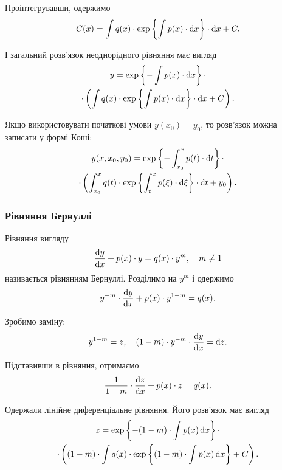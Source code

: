 Проінтегрувавши, одержимо
\begin{equation*} 
	C(x) = \int q(x) \cdot \exp \left\{\int p(x) \cdot \mathop{}\!\mathrm{d} x \right\} \cdot \mathop{}\!\mathrm{d} x + C.
\end{equation*}

І загальний розв’язок неоднорідного рівняння має вигляд
\begin{multline} 
	y = \exp \left\{ - \int p(x) \cdot \mathop{}\!\mathrm{d} x \right\} \cdot \\
	\cdot \left( \int q(x) \cdot \exp \left\{\int p(x) \cdot \mathop{}\!\mathrm{d} x \right\} \cdot \mathop{}\!\mathrm{d} x + C\right).
\end{multline}

Якщо використовувати початкові умови $y(x_0) = y_0$, то розв’язок можна записати у формі Коші:
\begin{multline} 
	y(x, x_0, y_0) = \exp \left\{ - \int_{x_0}^x p(t) \cdot \mathop{}\!\mathrm{d} t \right\} \cdot \\
	\cdot \left( \int_{x_0}^x q(t) \cdot \exp \left\{\int_t^x p(\xi) \cdot \mathop{}\!\mathrm{d} \xi \right\} \cdot \mathop{}\!\mathrm{d} t + y_0\right).
\end{multline}

\subsubsection{Рівняння Бернуллі}

Рівняння вигляду
\begin{equation*}
	\frac{\mathop{}\!\mathrm{d} y}{\mathop{}\!\mathrm{d} x} + p(x) \cdot y = q(x) \cdot y^m, \quad m \ne 1
\end{equation*}
називається рівнянням Бернуллі. Розділимо на $y^m$ і одержимо 
\begin{equation*}
	y^{-m} \cdot \frac{\mathop{}\!\mathrm{d} y}{\mathop{}\!\mathrm{d} x} + p(x) \cdot y^{1-m} = q(x).
\end{equation*}

Зробимо заміну: 
\begin{equation*}
	y^{1-m} = z, \quad (1 - m) \cdot y^{-m} \cdot \frac{\mathop{}\!\mathrm{d} y}{\mathop{}\!\mathrm{d} x} = \mathop{}\!\mathrm{d} z.
\end{equation*}

Підставивши в рівняння, отримаємо
\begin{equation*}
	\frac{1}{1-m} \cdot \frac{\mathop{}\!\mathrm{d} z}{\mathop{}\!\mathrm{d} x} + p(x) \cdot z = q(x).
\end{equation*}

Одержали лінійне диференціальне рівняння. Його розв’язок має вигляд
\begin{multline}
	z = \exp\left\{ -(1 - m) \cdot \int p(x) \mathop{}\!\mathrm{d} x \right\} \cdot \\
	\cdot \left( (1-m) \cdot \int q(x) \cdot \exp\left\{ (1 - m) \cdot \int p(x) \mathop{}\!\mathrm{d} x \right\} + C\right).
\end{multline}
 
